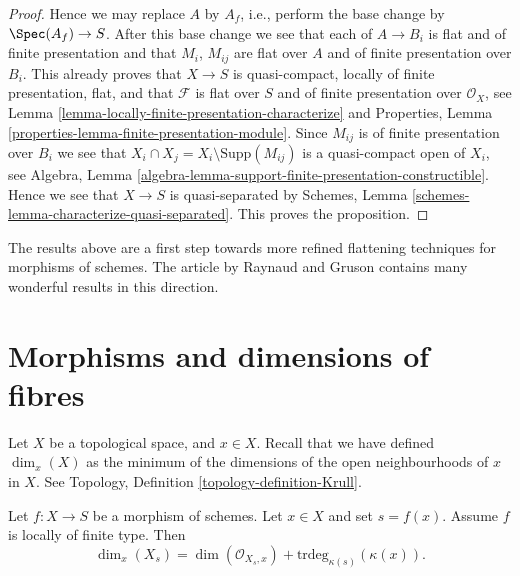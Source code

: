 \begin{proof}
\medskip\noindent
Hence we may replace $A$ by $A_f$, i.e.,
perform the base change by $\Spec(A_f) \to S$.
After this base change we see that each of $A \to B_i$ is
flat and of finite presentation and that $M_i$, $M_{ij}$ are flat over $A$
and of finite presentation over $B_i$.
This already proves that $X \to S$ is quasi-compact,
locally of finite presentation, flat, and that $\mathcal{F}$
is flat over $S$ and of finite presentation over $\mathcal{O}_X$, see
Lemma \ref{lemma-locally-finite-presentation-characterize}
and
Properties, Lemma \ref{properties-lemma-finite-presentation-module}.
Since $M_{ij}$ is of finite presentation over $B_i$ we see that
$X_i \cap X_j = X_i \setminus \text{Supp}(M_{ij})$ is a quasi-compact
open of $X_i$, see
Algebra, Lemma \ref{algebra-lemma-support-finite-presentation-constructible}.
Hence we see that $X \to S$ is quasi-separated by
Schemes, Lemma \ref{schemes-lemma-characterize-quasi-separated}.
This proves the proposition.
\end{proof}









\begin{remark}
\label{remark-flattening}
The results above are a first step towards more refined flattening techniques
for morphisms of schemes. The article \cite{GruRay} by Raynaud and Gruson
contains many wonderful results in this direction.
\end{remark}







\section{Morphisms and dimensions of fibres}
\label{section-dimension-fibres}

\noindent
Let $X$ be a topological space, and $x \in X$.
Recall that we have defined $\dim_x(X)$ as the minimum of the
dimensions of the open neighbourhoods of $x$ in $X$.
See Topology, Definition \ref{topology-definition-Krull}.

\begin{lemma}
\label{lemma-dimension-fibre-at-a-point}
Let $f : X \to S$ be a morphism of schemes.
Let $x \in X$ and set $s = f(x)$.
Assume $f$ is locally of finite type.
Then
$$
\dim_x(X_s) =
\dim(\mathcal{O}_{X_s, x}) + \text{trdeg}_{\kappa(s)}(\kappa(x)).
$$
\end{lemma}

